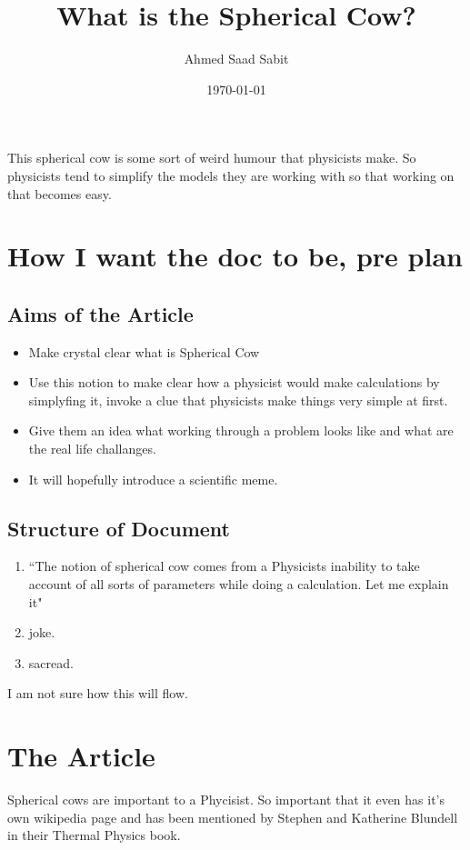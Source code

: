 \documentclass[12pt,a4paper,darkblue]{memoir}
\title{What is the Spherical Cow?}
\author{Ahmed Saad Sabit}
\date{\today}
\begin{document}
   
\maketitle

    \begin{small}
        This spherical cow is some sort of weird humour that physicists make. So physicists tend to simplify the models they are working with so that working on that becomes easy.
    \end{small}

    \section{How I want the doc to be, pre plan}
    
    \subsection{Aims of the Article}
    \begin{itemize}
        \item Make crystal clear what is Spherical Cow 
        \item Use this notion to make clear how a physicist would make calculations by simplyfing it, invoke a clue that physicists make things very simple at first.
        \item Give them an idea what working through a problem looks like and what are the real life challanges. 
        \item It will hopefully introduce a scientific meme. 

    \end{itemize} 

    \subsection{Structure of Document}
    \begin{enumerate}
        \item ``The notion of spherical cow comes from a Physicists inability to take account of all sorts of parameters while doing a calculation. Let me explain it" 
        \item joke.
        \item sacread. 
    \end{enumerate}

I am not sure how this will flow. 


\newpage 

\section{The Article}
Spherical cows are important to a Phycisist. So important that it even has it's own wikipedia page and has been mentioned by Stephen and Katherine Blundell in their Thermal Physics book.
\end{document}
